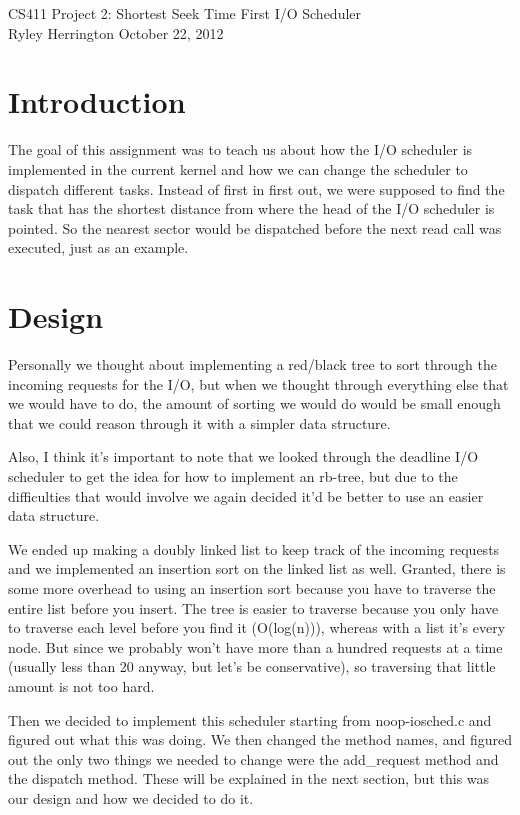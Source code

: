 \documentclass[letterpaper,10pt]{article}
\begin{document}
\begin{center}
{\large CS411 Project 2: Shortest Seek Time First I/O Scheduler} \\ %
Ryley Herrington
October 22, 2012
\end{center}

\section{Introduction}
The goal of this assignment was to teach us about how the I/O  scheduler is implemented in the current kernel and how we can change the scheduler to dispatch different tasks. Instead of first in first out, we were supposed to find the task that has the shortest distance from where the head of the I/O scheduler is pointed. So the nearest sector would be dispatched before the next read call was executed, just as an example. 

\section{Design}
Personally we thought about implementing a red/black tree to sort through the incoming requests for the I/O, but when we thought through everything else that we would have to do, the amount of sorting we would do would be small enough that we could reason through it with a simpler data structure. 

Also, I think it's important to note that we looked through the deadline I/O scheduler to get the idea for how to implement an rb-tree, but due to the difficulties that would involve we again decided it'd be better to use an easier data structure.

We ended up making a doubly linked list to keep track of the incoming requests and we implemented an insertion sort on the linked list as well. Granted, there is some more overhead to using an insertion sort because you have to traverse the entire list before you insert. The tree is easier to traverse because you only have to traverse each level before you find it (O(log(n))), whereas with a list it's every node. But since we probably won't have more than a hundred requests at a time (usually less than 20 anyway, but let's be conservative), so traversing that little amount is not too hard. 

Then we decided to implement this scheduler starting from noop-iosched.c and figured out what this was doing. We then changed the method names, and figured out the only two things we needed to change were the add\_request method and the dispatch method. These will be explained in the next section, but this was our design and how we decided to do it.
\end{document}
